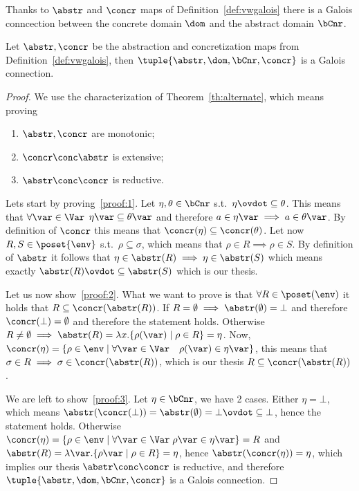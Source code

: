 Thanks to \(\abstr\) and \(\concr\) maps of
Definition~\ref{def:vwgalois} there is a Galois conncection between
the concrete domain \(\dom\) and the abstract domain \(\bCnr\).

\begin{lemma}
  Let \(\abstr, \concr\) be the abstraction and concretization maps
  from Definition~\ref{def:vwgalois}, then
  \(\tuple{\abstr, \dom, \bCnr, \concr}\) is a Galois connection.
\end{lemma}

\begin{proof}
  We use the characterization of Theorem~\ref{th:alternate}, which
  means proving
  \begin{enumerate}[label=(\roman*)]
  \item\label{proof:1} \(\abstr,\concr\) are monotonic;
  \item\label{proof:2} \(\concr \conc \abstr\) is extensive;
  \item\label{proof:3} \(\abstr\conc\concr\) is reductive.
  \end{enumerate}

  Lets start by proving~\ref{proof:1}. Let \(\eta, \theta \in \bCnr\)
  s.t.\ \(\eta\ovdot\subseteq\theta\). This means that
  \(\forall \var\in\Var\) \(\eta\var \subseteq \theta\var\) and
  therefore \(a\in\eta\var \implies a\in\theta\var\). By definition of
  \(\concr\) this means that
  \(\concr(\eta) \subseteq \concr(\theta)\). Let now
  \(R, S \in \poset{\env}\) s.t.\ \(\rho \subseteq \sigma\), which
  means that \(\rho \in R \implies \rho \in S\). By definition of
  \(\abstr\) it follows that
  \(\eta \in \abstr(R) \implies \eta \in \abstr(S)\) which means
  exactly \(\abstr(R) \ovdot\subseteq \abstr(S)\) which is our thesis.

  Let us now show~\ref{proof:2}. What we want to prove is that
  \(\forall R\in\poset(\env)\) it holds that
  \(R \subseteq \concr(\abstr(R))\). If
  \(R = \emptyset \implies \abstr(\emptyset) = \bot\) and therefore
  \(\concr(\bot) = \emptyset\) and therefore the statement
  holds. Otherwise
  \(R \neq \emptyset \implies \abstr(R) = \lambda x . \{\rho(\var)
  \mid \rho \in R\} = \eta\). Now,
  \(\concr(\eta) = \{\rho \in \env \mid \forall \var\in\Var \quad
  \rho(\var) \in \eta\var\}\), this means that
  \(\sigma \in R \implies \sigma \in \concr(\abstr(R))\), which is our
  thesis \(R \subseteq \concr(\abstr(R))\).

  We are left to show~\ref{proof:3}. Let \(\eta \in \bCnr\), we have 2
  cases. Either \(\eta = \bot\), which means
  \(\abstr(\concr(\bot)) = \abstr(\emptyset) = \bot \ovdot\subseteq
  \bot\), hence the statement holds. Otherwise
  \(\concr(\eta) = \{\rho \in \env \mid \forall \var\in\Var \;
  \rho\var \in \eta\var\} = R\) and
  \(\abstr(R) = \lambda\var.\{\rho\var \mid \rho\in R\} =\eta\), hence
  \(\abstr(\concr(\eta)) = \eta\), which implies our thesis
  \(\abstr \conc \concr\) is reductive, and therefore
  \(\tuple{\abstr, \dom, \bCnr, \concr}\) is a Galois connection.
\end{proof}


